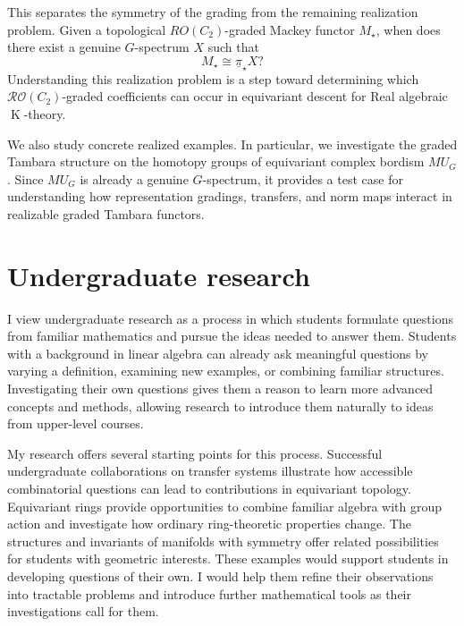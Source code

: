 \documentclass[11pt]{article}
\newcommand{\K}{\operatorname{K}}
\begin{document}
This separates the symmetry of the grading from the remaining realization problem.
Given a topological $RO(C_2)$-graded Mackey functor $M_\star$, when does there exist a genuine $G$-spectrum $X$ such that
\[
M_\star \cong \underline{\pi}_\star X?
\]
Understanding this realization problem is a step toward determining which $\mathcal{RO}(C_2)$-graded coefficients can occur in equivariant descent for Real algebraic $\K$-theory.

We also study concrete realized examples. 
In particular, we investigate the graded Tambara structure on the homotopy groups of equivariant complex bordism $MU_G$.
Since $MU_G$ is already a genuine $G$-spectrum, it provides a test case for understanding how representation gradings, transfers, and norm maps interact in realizable graded Tambara functors.

\section{Undergraduate research}
I view undergraduate research as a process in which students formulate questions from familiar mathematics and pursue the ideas needed to answer them.
Students with a background in linear algebra can already ask meaningful questions by varying a definition, examining new examples, or combining familiar structures.
Investigating their own questions gives them a reason to learn more advanced concepts and methods, allowing research to introduce them naturally to ideas from upper-level courses.

My research offers several starting points for this process.
Successful undergraduate collaborations on transfer systems illustrate how accessible combinatorial questions can lead to contributions in equivariant topology.
Equivariant rings provide opportunities to combine familiar algebra with group action and investigate how ordinary ring-theoretic properties change.
The structures and invariants of manifolds with symmetry offer related possibilities for students with geometric interests.
These examples would support students in developing questions of their own.
I would help them refine their observations into tractable problems and introduce further mathematical tools as their investigations call for them.



\end{document}
